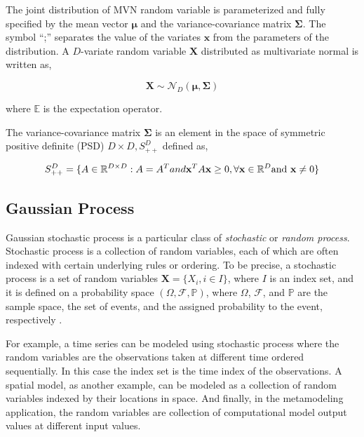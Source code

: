 The joint distribution of MVN random variable is parameterized and fully specified by the mean vector $\boldsymbol{\mu}$ and the variance-covariance matrix $\boldsymbol{\Sigma}$. The symbol ``;'' separates the value of the variates $\boldsymbol{x}$ from the parameters of the distribution. 
A $D$-variate random variable $\boldsymbol{X}$ distributed as multivariate normal is written as,

\begin{equation}
	\boldsymbol{X} \sim \mathcal{N}_D\left(\boldsymbol{\mu}, \boldsymbol{\Sigma}\right)
\end{equation}

where $\mathbb{E}$ is the expectation operator.

The variance-covariance matrix $\boldsymbol{\Sigma}$ is an element in the space of symmetric positive definite (PSD) $D \times D, S_{++}^D$ defined as,

\begin{equation}
	S_{++}^D = \{A \in \mathbb{R}^{D\times D}: A = A^T and \mathbf{x}^T A \mathbf{x} \geq 0, \forall \mathbf{x} \in \mathbb{R}^D \textnormal{and } \mathbf{x} \neq 0 \}
	\label{eq:covariance_matrix}
\end{equation}

\subsection{Gaussian Process}

Gaussian stochastic process is a particular class of \emph{stochastic} or \emph{random process}.
Stochastic process is a collection of random variables, each of which are often indexed with certain underlying rules or ordering.
To be precise, a stochastic process is a set of random variables $\mathbf{X} = \{X_i, i \in I\}$, where $I$ is an index set, 
and it is defined on a probability space $(\Omega, \mathcal{F}, \mathbb{P})$, 
where $\Omega$, $\mathcal{F}$, and $\mathbb{P}$ are the sample space, the set of events, and the assigned probability to the event, respectively \cite{Syski2014}.

For example, a time series can be modeled using stochastic process where the random variables are the observations taken at different time ordered sequentially.
In this case the index set is the time index of the observations.
A spatial model, as another example, can be modeled as a collection of random variables indexed by their locations in space.
And finally, in the metamodeling application, the random variables are collection of computational model output values at different input values.

